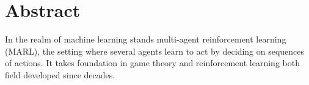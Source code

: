 
\chapter*{Abstract}

In the realm of machine learning stands multi-agent reinforcement learning (MARL), the setting where several agents learn to act by deciding on sequences of actions.
It takes foundation in game theory and reinforcement learning both field developed since decades.

